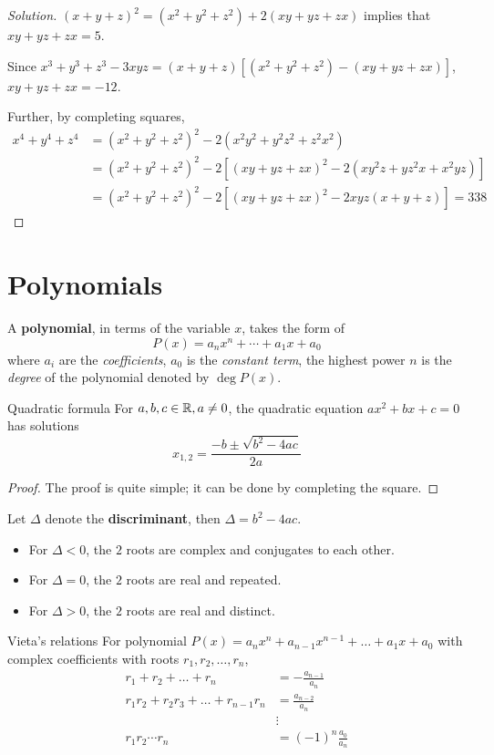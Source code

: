 \begin{proof}[Solution]
$(x+y+z)^2=(x^2+y^2+z^2)+2(xy+yz+zx)$ implies that $xy+yz+zx=5$.

Since $x^3+y^3+z^3-3xyz=(x+y+z)[(x^2+y^2+z^2)-(xy+yz+zx)]$, $xy+yz+zx=\boxed{-12}$.

Further, by completing squares,
\begin{align*}
x^4+y^4+z^4 &= (x^2+y^2+z^2)^2-2(x^2y^2+y^2z^2+z^2x^2) \\
&= (x^2+y^2+z^2)^2-2[(xy+yz+zx)^2-2(xy^2z+yz^2x+x^2yz)] \\
&= (x^2+y^2+z^2)^2-2[(xy+yz+zx)^2-2xyz(x+y+z)] = \boxed{338}
\end{align*}
\end{proof}
\pagebreak

\section{Polynomials}
A \textbf{polynomial}, in terms of the variable $x$, takes the form of 
\[ P(x)=a_nx^n+\cdots+a_1x+a_0 \]
where $a_i$ are the \emph{coefficients}, $a_0$ is the \emph{constant term}, the highest power $n$ is the \emph{degree} of the polynomial denoted by $\deg P(x)$.

\begin{thrm}{Quadratic formula}{} 
For $a,b,c \in \mathbb R, a \neq 0$, the quadratic equation $ax^2 + bx + c = 0$ has solutions 
\begin{equation} x_{1,2} = \frac{-b \pm \sqrt{b^2-4ac}}{2a} \end{equation}
\end{thrm}
\begin{proof}
The proof is quite simple; it can be done by completing the square.
\end{proof}

Let $\Delta$ denote the \textbf{discriminant}, then $\Delta = b^2-4ac$.
\begin{itemize}
\item For $\Delta < 0$, the $2$ roots are complex and conjugates to each other.
\item For $\Delta = 0$, the $2$ roots are real and repeated.
\item For $\Delta > 0$, the $2$ roots are real and distinct.
\end{itemize}

\begin{thrm}{Vieta's relations}{} 
For polynomial $P(x) = a_n x^n + a_{n-1} x^{n-1} + \dots + a_1 x + a_0$ with complex coefficients with roots $r_1, r_2, \dots, r_n$, 
\begin{equation}
\begin{split}
r_1 + r_2 + \dots + r_n &= -\frac{a_{n-1}}{a_n} \\
r_1 r_2 + r_2 r_3 + \dots + r_{n-1} r_n &= \frac{a_{n-2}}{a_n} \\
&\vdots \\
r_1 r_2 \cdots r_n &= (-1)^n \frac{a_0}{a_n}
\end{split}
\end{equation}
\end{thrm}

